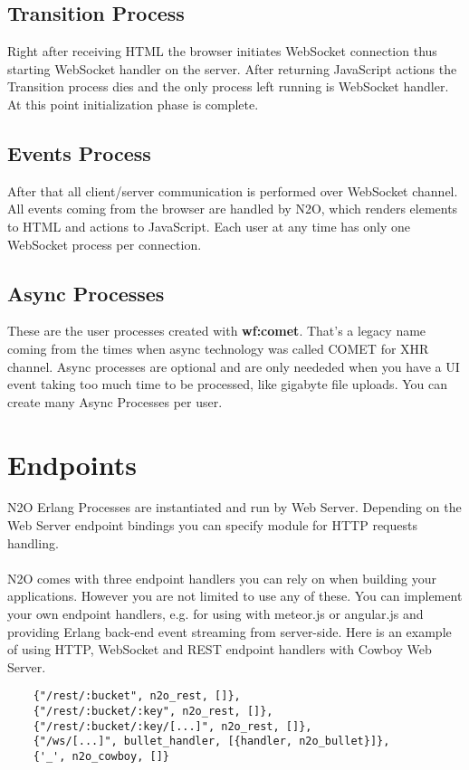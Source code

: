 \subsection{Transition Process}
Right after receiving HTML the browser initiates WebSocket connection
thus starting WebSocket handler on the server. After returning
JavaScript actions the Transition process dies and the only process left
running is WebSocket handler. At this point initialization phase is complete.

\subsection{Events Process}
After that all client/server communication is performed over
WebSocket channel. All events coming from the browser are
handled by N2O, which renders elements to HTML and actions to
JavaScript. Each user at any time has only one WebSocket process
per connection.

\subsection{Async Processes}
These are the user processes created with {\bf wf:comet}.
That's a legacy name coming from the times when async technology
was called COMET for XHR channel. Async processes are optional
and are only neededed when you have a UI event taking too much
time to be processed, like gigabyte file uploads. You can create
many Async Processes per user.

\section{Endpoints}
N2O Erlang Processes are instantiated and run by Web Server.
Depending on the Web Server endpoint bindings you can specify
module for HTTP requests handling.

\paragraph{}
N2O comes with three endpoint handlers you can rely on when building your
applications. However you are not limited to use any of these.
You can implement your own endpoint handlers, e.g. for using with
meteor.js or angular.js and providing Erlang back-end event streaming
from server-side. Here is an example of using HTTP, WebSocket and
REST endpoint handlers with Cowboy Web Server.

\vspace{1\baselineskip}
\begin{lstlisting}
    {"/rest/:bucket", n2o_rest, []},
    {"/rest/:bucket/:key", n2o_rest, []},
    {"/rest/:bucket/:key/[...]", n2o_rest, []},
    {"/ws/[...]", bullet_handler, [{handler, n2o_bullet}]},
    {'_', n2o_cowboy, []}
\end{lstlisting}

